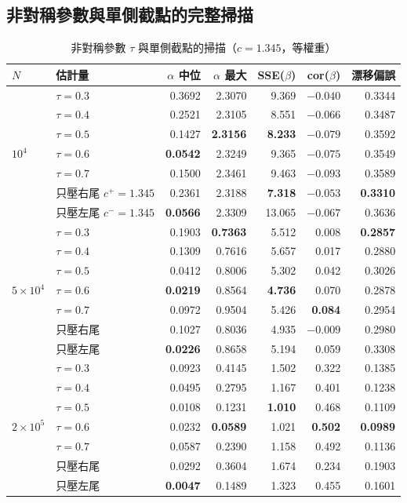 \documentclass[UTF8, fontset=macnew, a4paper, 12pt]{ctexart}
\begin{document}
\subsection{非對稱參數與單側截點的完整掃描}

\begin{table}[H]
\centering
\caption{非對稱參數 $\tau$ 與單側截點的掃描（$c=1.345$，等權重）}
\small
\begin{tabular}{llrrrrr}
\toprule
$N$ & 估計量 & $\alpha$ 中位 & $\alpha$ 最大 & SSE($\beta$) & cor($\beta$) & 漂移偏誤\\
\midrule
\multirow{7}{*}{$10^4$}
 & $\tau=0.3$              & 0.3692 & 2.3070 & 9.369 & $-0.040$ & 0.3344\\
 & $\tau=0.4$              & 0.2521 & 2.3105 & 8.551 & $-0.066$ & 0.3487\\
 & $\tau=0.5$              & 0.1427 & \textbf{2.3156} & \textbf{8.233} & $-0.079$ & 0.3592\\
 & $\tau=0.6$              & \textbf{0.0542} & 2.3249 & 9.365 & $-0.075$ & 0.3549\\
 & $\tau=0.7$              & 0.1500 & 2.3461 & 9.463 & $-0.093$ & 0.3589\\
 & 只壓右尾 $c^+\!=\!1.345$ & 0.2361 & 2.3188 & \textbf{7.318} & $-0.053$ & \textbf{0.3310}\\
 & 只壓左尾 $c^-\!=\!1.345$ & \textbf{0.0566} & 2.3309 & 13.065 & $-0.067$ & 0.3636\\
\midrule
\multirow{7}{*}{$5\times10^4$}
 & $\tau=0.3$              & 0.1903 & \textbf{0.7363} & 5.512 & 0.008 & \textbf{0.2857}\\
 & $\tau=0.4$              & 0.1309 & 0.7616 & 5.657 & 0.017 & 0.2880\\
 & $\tau=0.5$              & 0.0412 & 0.8006 & 5.302 & 0.042 & 0.3026\\
 & $\tau=0.6$              & \textbf{0.0219} & 0.8564 & \textbf{4.736} & 0.070 & 0.2878\\
 & $\tau=0.7$              & 0.0972 & 0.9504 & 5.426 & \textbf{0.084} & 0.2954\\
 & 只壓右尾                & 0.1027 & 0.8036 & 4.935 & $-0.009$ & 0.2980\\
 & 只壓左尾                & \textbf{0.0226} & 0.8658 & 5.194 & 0.059 & 0.3308\\
\midrule
\multirow{7}{*}{$2\times10^5$}
 & $\tau=0.3$              & 0.0923 & 0.4145 & 1.502 & 0.322 & 0.1385\\
 & $\tau=0.4$              & 0.0495 & 0.2795 & 1.167 & 0.401 & 0.1238\\
 & $\tau=0.5$              & 0.0108 & 0.1231 & \textbf{1.010} & 0.468 & 0.1109\\
 & $\tau=0.6$              & 0.0232 & \textbf{0.0589} & 1.021 & \textbf{0.502} & \textbf{0.0989}\\
 & $\tau=0.7$              & 0.0587 & 0.2390 & 1.158 & 0.492 & 0.1136\\
 & 只壓右尾                & 0.0292 & 0.3604 & 1.674 & 0.234 & 0.1903\\
 & 只壓左尾                & \textbf{0.0047} & 0.1489 & 1.323 & 0.455 & 0.1601\\
\bottomrule
\end{tabular}
\label{tab:mqtau}
\end{table}
\end{document}
